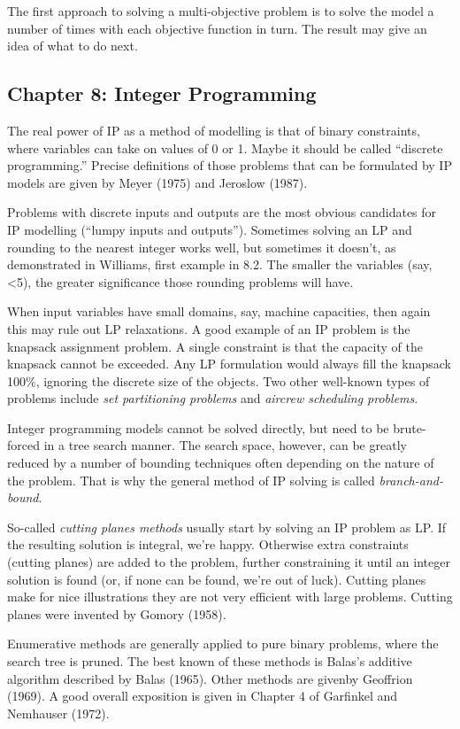 \documentclass[13pt, letterpaper, twoside]{book}
\begin{document}
The first approach to solving a multi-objective problem is to solve the model a number of times with each objective function in turn. The result may give an idea of what to do next.


\subsection{Chapter 8: Integer Programming}

The real power of IP as a method of modelling is that of binary constraints, where variables can take on values of 0 or 1. Maybe it should be called ``discrete programming.'' Precise definitions of those problems that can be formulated by IP models are given by Meyer (1975) and Jeroslow (1987). 

Problems with discrete inputs and outputs are the most obvious candidates for IP modelling (``lumpy inputs and outputs''). Sometimes solving an LP and rounding to the nearest integer works well, but sometimes it doesn't, as demonstrated in Williams, first example in 8.2. The smaller the variables (say, <5), the greater significance those rounding problems will have. 

When input variables have small domains, say, machine capacities, then again this may rule out LP relaxations. A good example of an IP problem is the knapsack assignment problem. A single constraint is that the capacity of the knapsack cannot be exceeded. Any LP formulation would always fill the knapsack 100\%, ignoring the discrete size of the objects. Two other well-known types of problems include \textit{set partitioning problems} and \textit{aircrew scheduling problems}. 

Integer programming models cannot be solved directly, but need to be brute-forced in a tree search manner. The search space, however, can be greatly reduced by a number of bounding techniques often depending on the nature of the problem. That is why the general method of IP solving is called \textit{branch-and-bound}.

So-called \textit{cutting planes methods} usually start by solving an IP problem as LP. If the resulting solution is integral, we're happy. Otherwise extra constraints (cutting planes) are added to the problem, further constraining it until an integer solution is found (or, if none can be found, we're out of luck). Cutting planes make for nice illustrations they are not very efficient with large problems. Cutting planes were invented by Gomory (1958).

Enumerative methods are generally applied to pure binary problems, where the search tree is pruned. The best known of these methods is Balas's additive algorithm described by Balas (1965). Other methods are givenby Geoffrion (1969). A good overall exposition is given in Chapter 4 of Garfinkel and Nemhauser (1972).
\end{document}

